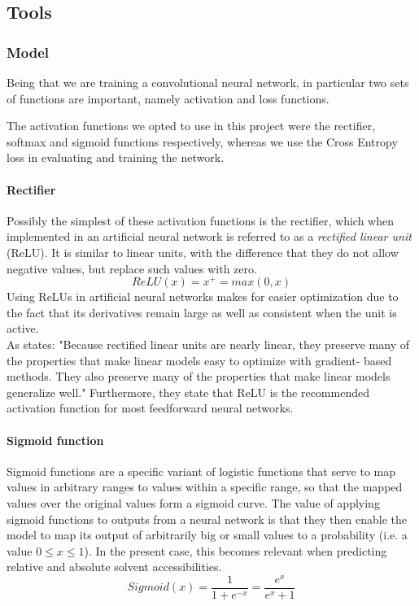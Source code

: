 \begin{multicols}{2}
\subsection{Tools}
\subsubsection{Model}
Being that we are training a convolutional neural network, in particular two sets of functions are important, namely activation and loss functions.

The activation functions we opted to use in this project were the rectifier, softmax and sigmoid functions respectively, whereas we use the Cross Entropy loss in evaluating and training the network.
\paragraph{Rectifier}
Possibly the simplest of these activation functions is the rectifier, which when implemented in an artificial neural network is referred to as a \textit{rectified linear unit} (ReLU). It is similar to linear units, with the difference that they do not allow negative values, but replace such values with zero.
\[
ReLU(x) = x^+ = max(0,x)
\]
\noindent Using ReLUs in artificial neural networks makes for easier optimization due to the fact that its derivatives remain large as well as consistent when the unit is active\citep[p. 189]{goodfellow-et-al-2016}.\\
As \citeauthor{goodfellow-et-al-2016} states: "Because rectified linear units are nearly linear, they preserve many of the properties that make linear models easy to optimize with gradient-
based methods. They also preserve many of the properties that make linear models generalize well."\citep[p. 170]{goodfellow-et-al-2016} Furthermore, they state that ReLU is the recommended activation function for most feedforward neural networks\citep[p. 170]{goodfellow-et-al-2016}.

\paragraph{Sigmoid function}
Sigmoid functions are a specific variant of logistic functions that serve to map values in arbitrary ranges to values within a specific range, so that the mapped values over the original values form a sigmoid curve. The value of applying sigmoid functions to outputs from a neural network is that they then enable the model to map its output of arbitrarily big or small values to a probability (i.e. a value $0\leq x \leq 1$). In the present case, this becomes relevant when predicting relative and absolute solvent accessibilities.
\[
Sigmoid(x) = \frac{1}{1 + e^{-x}} = \frac{e^x}{e^x +1}
\]


\end{multicols}
